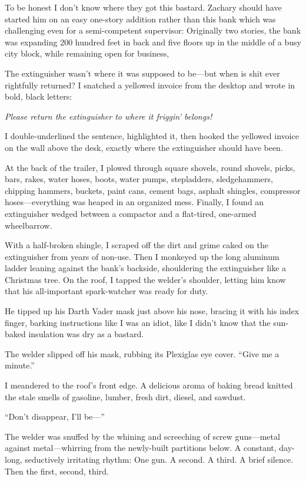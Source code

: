 To be honest I don't know where they got this bastard. Zachary should
have started him on an easy one-story addition rather than this bank
which was challenging even for a semi-competent supervisor: Originally
two stories, the bank was expanding 200 hundred feet in back and five
floors up in the middle of a busy city block, while remaining open for
business,

The extinguisher wasn't where it was supposed to be---but when is shit
ever rightfully returned? I snatched a yellowed invoice from the desktop
and wrote in bold, black letters: ~~~

\emph{Please return the extinguisher to where it friggin' belongs!}

I double-underlined the sentence, highlighted it, then hooked the
yellowed invoice on the wall above the desk, exactly where the
extinguisher should have been.

At the back of the trailer, I plowed through square shovels, round
shovels, picks, bars, rakes, water hoses, boots, water pumps,
stepladders, sledgehammers, chipping hammers, buckets, paint cans,
cement bags, asphalt shingles, compressor hoses---everything was heaped
in an organized mess. Finally, I found an extinguisher wedged between a
compactor and a flat-tired, one-armed wheelbarrow.

With a half-broken shingle, I scraped off the dirt and grime caked on
the extinguisher from years of non-use. Then I monkeyed up the long
aluminum ladder leaning against the bank's backside, shouldering the
extinguisher like a Christmas tree. On the roof, I tapped the welder's
shoulder, letting him know that his all-important spark-watcher was
ready for duty.

He tipped up his Darth Vader mask just above his nose, bracing it with
his index finger, barking instructions like I was an idiot, like I
didn't know that the sun-baked insulation was dry as a bastard.

The welder slipped off his mask, rubbing its Plexiglas eye cover. ``Give
me a minute.''

I meandered to the roof's front edge. A delicious aroma of baking bread
knitted the stale smells of gasoline, lumber, fresh dirt, diesel, and
sawdust.

``Don't disappear, I'll be---''

The welder was snuffed by the whining and screeching of screw
guns---metal against metal---whirring from the newly-built partitions
below. A constant, day-long, seductively irritating rhythm: One gun. A
second. A third. A brief silence. Then the first, second, third. ~~~~

